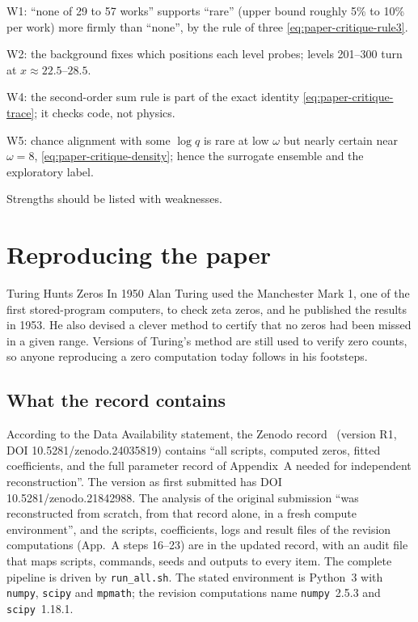 \begin{keyideas}
\item W1: ``none of 29 to 57 works'' supports ``rare'' (upper bound roughly 5\% to 10\% per work) more firmly than ``none'', by the rule of three \eqref{eq:paper-critique-rule3}.
\item W2: the background fixes which positions each level probes; levels 201--300 turn at $x\approx22.5$--$28.5$.
\item W4: the second-order sum rule is part of the exact identity \eqref{eq:paper-critique-trace}; it checks code, not physics.
\item W5: chance alignment with some $\log q$ is rare at low $\omega$ but nearly certain near $\omega=8$, \eqref{eq:paper-critique-density}; hence the surrogate ensemble and the exploratory label.
\item Strengths should be listed with weaknesses.
\end{keyideas}

\section{Reproducing the paper}\label{sec:paper-critique-repro}
\begin{didyouknow}{Turing Hunts Zeros}
In 1950 Alan Turing used the Manchester Mark 1, one of the first stored-program computers, to check zeta zeros, and he published the results in 1953. He also devised a clever method to certify that no zeros had been missed in a given range. Versions of Turing's method are still used to verify zero counts, so anyone reproducing a zero computation today follows in his footsteps.
\end{didyouknow}

\subsection{What the record contains}

According to the Data Availability statement, the Zenodo record~\cite{zenodo} (version R1, DOI 10.5281/zenodo.24035819) contains ``all scripts, computed zeros, fitted coefficients, and the full parameter record of Appendix~A needed for independent reconstruction''. The version as first submitted has DOI 10.5281/zenodo.21842988. The analysis of the original submission ``was reconstructed from scratch, from that record alone, in a fresh compute environment'', and the scripts, coefficients, logs and result files of the revision computations (App.~A steps 16--23) are in the updated record, with an audit file that maps scripts, commands, seeds and outputs to every item. The complete pipeline is driven by \texttt{run\_all.sh}. The stated environment is Python~3 with \texttt{numpy}, \texttt{scipy} and \texttt{mpmath}; the revision computations name \texttt{numpy}~2.5.3 and \texttt{scipy}~1.18.1.

